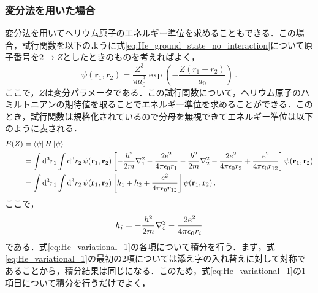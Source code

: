 \documentclass[a4paper,dvipdfmx,10.5pt]{jarticle}
\begin{document}
\subsubsection{変分法を用いた場合}
変分法を用いてヘリウム原子のエネルギー準位を求めることもできる．この場合，試行関数を以下のように式\eqref{eq:He_ground_state_no_interaction}について原子番号を$2\to Z$としたときのものを考えればよく，
\begin{equation}
  \psi(\mathbf{r}_1, \mathbf{r}_2) = \frac{Z^3}{\pi a_0^3} \exp\left(-\frac{Z(r_1 + r_2)}{a_0}\right)\,.\label{eq:He_trial_wavefunction}
\end{equation}
ここで，$Z$は変分パラメータである．この試行関数について，ヘリウム原子のハミルトニアンの期待値を取ることでエネルギー準位を求めることができる．このとき，試行関数は規格化されているので分母を無視できてエネルギー準位は以下のように表される．
\begin{align}
  E(Z) &= \bra{\psi} H \ket{\psi} \\
       &=  \int \dd[3]{r_1} \int \dd[3]{r_2} \psi(\mathbf{r}_1, \mathbf{r}_2)\left[-\frac{\hbar^2}{2m} \laplacian_1  - \frac{2e^2}{4\pi \epsilon_0 r_1} - \frac{\hbar^2}{2m} \laplacian_2- \frac{2e^2}{4\pi \epsilon_0 r_2} + \frac{e^2}{4\pi \epsilon_0 r_{12}} \right] \psi(\mathbf{r}_1, \mathbf{r}_2)\\
       &= \int \dd[3]{r_1} \int \dd[3]{r_2} \psi(\mathbf{r}_1, \mathbf{r}_2) \left[h_1 + h_2 + \frac{e^2}{4\pi \epsilon_0 r_{12}} \right] \psi(\mathbf{r}_1, \mathbf{r}_2)
        \,.\label{eq:He_variational_1}
\end{align}
ここで，
\begin{equation}
  h_i = -\frac{\hbar^2}{2m} \laplacian_i - \frac{2e^2}{4\pi \epsilon_0 r_i}
\end{equation}
である．式\eqref{eq:He_variational_1}の各項について積分を行う．まず，式\eqref{eq:He_variational_1}の最初の2項については添え字の入れ替えに対して対称であることから，積分結果は同じになる．このため，式\eqref{eq:He_variational_1}の1項目について積分を行うだけでよく，
\end{document}
